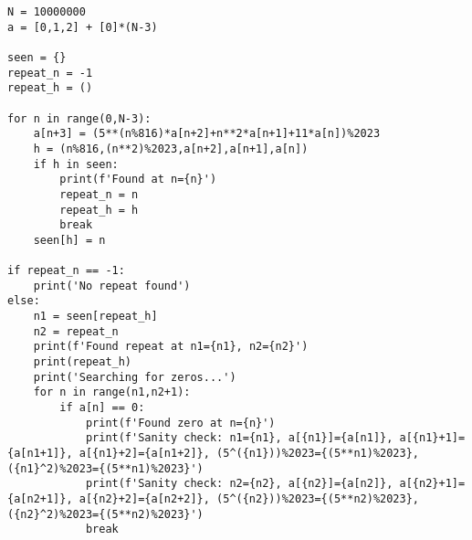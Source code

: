 \documentclass[letterpaper, reqno,11pt]{article}
\begin{document}
\begin{lstlisting}
N = 10000000
a = [0,1,2] + [0]*(N-3)

seen = {}
repeat_n = -1
repeat_h = ()

for n in range(0,N-3):
    a[n+3] = (5**(n%816)*a[n+2]+n**2*a[n+1]+11*a[n])%2023
    h = (n%816,(n**2)%2023,a[n+2],a[n+1],a[n])
    if h in seen:
        print(f'Found at n={n}')
        repeat_n = n
        repeat_h = h
        break
    seen[h] = n

if repeat_n == -1:
    print('No repeat found')
else:
    n1 = seen[repeat_h]
    n2 = repeat_n
    print(f'Found repeat at n1={n1}, n2={n2}')
    print(repeat_h)
    print('Searching for zeros...')
    for n in range(n1,n2+1):
        if a[n] == 0:
            print(f'Found zero at n={n}')
            print(f'Sanity check: n1={n1}, a[{n1}]={a[n1]}, a[{n1}+1]={a[n1+1]}, a[{n1}+2]={a[n1+2]}, (5^({n1}))%2023={(5**n1)%2023}, ({n1}^2)%2023={(5**n1)%2023}')
            print(f'Sanity check: n2={n2}, a[{n2}]={a[n2]}, a[{n2}+1]={a[n2+1]}, a[{n2}+2]={a[n2+2]}, (5^({n2}))%2023={(5**n2)%2023}, ({n2}^2)%2023={(5**n2)%2023}')
            break
\end{lstlisting}
\end{document}
